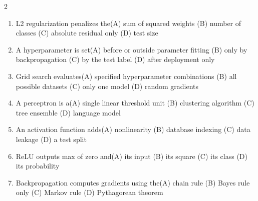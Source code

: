 \documentclass[a4paper]{article}
\begin{document}
\begin{multicols*}{2}
\begin{enumerate}[resume]
\item L2 regularization penalizes the\newline\hspace*{0.6em}(A) sum of squared weights \quad (B) number of classes \newline\hspace*{0.6em}(C) absolute residual only \quad (D) test size
\item A hyperparameter is set\newline\hspace*{0.6em}(A) before or outside parameter fitting \quad (B) only by backpropagation \newline\hspace*{0.6em}(C) by the test label \quad (D) after deployment only
\item Grid search evaluates\newline\hspace*{0.6em}(A) specified hyperparameter combinations \quad (B) all possible datasets \newline\hspace*{0.6em}(C) only one model \quad (D) random gradients
\item A perceptron is a\newline\hspace*{0.6em}(A) single linear threshold unit \quad (B) clustering algorithm \newline\hspace*{0.6em}(C) tree ensemble \quad (D) language model
\item An activation function adds\newline\hspace*{0.6em}(A) nonlinearity \quad (B) database indexing \newline\hspace*{0.6em}(C) data leakage \quad (D) a test split
\item ReLU outputs max of zero and\newline\hspace*{0.6em}(A) its input \quad (B) its square \newline\hspace*{0.6em}(C) its class \quad (D) its probability
\item Backpropagation computes gradients using the\newline\hspace*{0.6em}(A) chain rule \quad (B) Bayes rule only \newline\hspace*{0.6em}(C) Markov rule \quad (D) Pythagorean theorem

\end{enumerate}
\end{multicols*}
\end{document}
